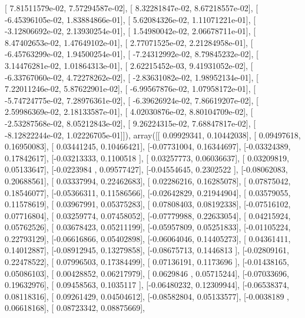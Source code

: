 \documentclass{article}
\begin{document}
       [  7.81511579e-02,   7.57294587e-02],
       [  8.32281847e-02,   8.67218557e-02],
       [ -6.45396105e-02,   1.83884866e-01],
       [  5.62084326e-02,   1.11071221e-01],
       [ -3.12806692e-02,   2.13930254e-01],
       [  1.54980042e-02,   2.06678711e-01],
       [  8.47402653e-02,   1.47649102e-01],
       [  2.77071525e-02,   2.21284958e-01],
       [ -6.45763299e-02,   1.94500254e-01],
       [ -7.24312992e-02,   8.79845232e-02],
       [  3.14476281e-02,   1.01864313e-01],
       [  2.62215452e-03,   9.41931052e-02],
       [ -6.33767060e-02,   4.72278262e-02],
       [ -2.83631082e-02,   1.98952134e-01],
       [  7.22011246e-02,   5.87622901e-02],
       [ -6.99567876e-02,   1.07958172e-01],
       [ -5.74724775e-02,   7.28976361e-02],
       [ -6.39626924e-02,   7.86619207e-02],
       [  2.59986369e-02,   2.18133587e-01],
       [  4.02030876e-02,   8.80104709e-02],
       [ -2.53287568e-02,   8.05212843e-02],
       [  9.26224315e-02,   7.68847817e-02],
       [ -8.12822244e-02,   1.02226705e-01]]), array([[ 0.09929341,  0.10442038],
       [ 0.09497618,  0.16950083],
       [ 0.03441245,  0.10466421],
       [-0.07731004,  0.16344697],
       [-0.03324389,  0.17842617],
       [-0.03213333,  0.1100518 ],
       [ 0.03257773,  0.06036637],
       [ 0.03209819,  0.05133647],
       [-0.0223984 ,  0.09577427],
       [-0.04554645,  0.2302522 ],
       [-0.08062083,  0.20688561],
       [ 0.03337994,  0.22462683],
       [ 0.02286216,  0.16285078],
       [ 0.07875042,  0.18546077],
       [-0.05366311,  0.11586566],
       [-0.02642829,  0.21944904],
       [ 0.03579055,  0.11578619],
       [ 0.03967991,  0.05375283],
       [ 0.07808403,  0.08192338],
       [-0.07516102,  0.07716804],
       [ 0.03259774,  0.07458052],
       [-0.07779988,  0.22633054],
       [ 0.04215924,  0.05762526],
       [ 0.03678423,  0.05211199],
       [-0.05957809,  0.05251833],
       [-0.01105224,  0.22793129],
       [-0.06616866,  0.05402898],
       [-0.06064046,  0.14405273],
       [ 0.04361411,  0.14012887],
       [-0.08912945,  0.13279858],
       [-0.08675713,  0.1446813 ],
       [-0.02809161,  0.22478522],
       [ 0.07996503,  0.17384499],
       [ 0.07136191,  0.1173696 ],
       [-0.01438165,  0.05086103],
       [ 0.00428852,  0.06217979],
       [ 0.0629846 ,  0.05715244],
       [-0.07033696,  0.19632976],
       [ 0.09458563,  0.1035117 ],
       [-0.06480232,  0.12309944],
       [-0.06538374,  0.08118316],
       [ 0.09261429,  0.04504612],
       [-0.08582804,  0.05133577],
       [-0.0038189 ,  0.06618168],
       [ 0.08723342,  0.08875669],
\end{document}
